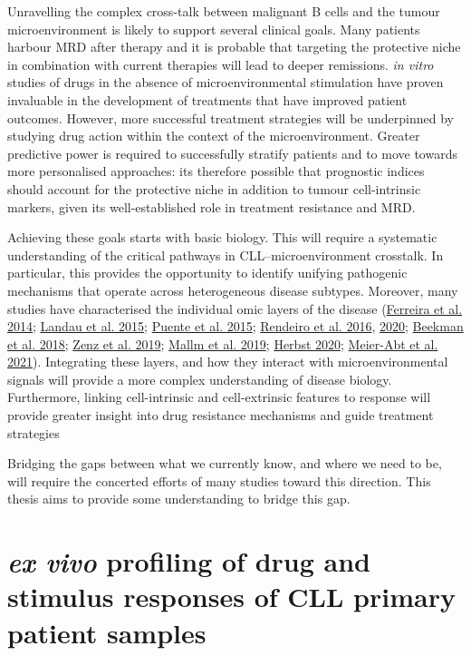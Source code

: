 \documentclass[11pt, a4paper, twosided]{book}
\begin{document}
Unravelling the complex cross-talk between malignant B cells and the tumour microenvironment is likely to support several clinical goals. Many patients harbour MRD after therapy and it is probable that targeting the protective niche in combination with current therapies will lead to deeper remissions. \emph{in vitro} studies of drugs in the absence of microenvironmental stimulation have proven invaluable in the development of treatments that have improved patient outcomes. However, more successful treatment strategies will be underpinned by studying drug action within the context of the microenvironment. Greater predictive power is required to successfully stratify patients and to move towards more personalised approaches: its therefore possible that prognostic indices should account for the protective niche in addition to tumour cell-intrinsic markers, given its well-established role in treatment resistance and MRD.

Achieving these goals starts with basic biology. This will require a systematic understanding of the critical pathways in CLL--microenvironment crosstalk. In particular, this provides the opportunity to identify unifying pathogenic mechanisms that operate across heterogeneous disease subtypes. Moreover, many studies have characterised the individual omic layers of the disease (\protect\hyperlink{ref-Ferreira2014}{Ferreira et al. 2014}; \protect\hyperlink{ref-Landau2015}{Landau et al. 2015}; \protect\hyperlink{ref-Puente2015}{Puente et al. 2015}; \protect\hyperlink{ref-Rendeiro2016}{Rendeiro et al. 2016}, \protect\hyperlink{ref-Rendeiro2020}{2020}; \protect\hyperlink{ref-Beekman2018}{Beekman et al. 2018}; \protect\hyperlink{ref-Zenz2019}{Zenz et al. 2019}; \protect\hyperlink{ref-Mallm2019}{Mallm et al. 2019}; \protect\hyperlink{ref-HerbstThesis}{Herbst 2020}; \protect\hyperlink{ref-MeierAbt2021}{Meier-Abt et al. 2021}). Integrating these layers, and how they interact with microenvironmental signals will provide a more complex understanding of disease biology. Furthermore, linking cell-intrinsic and cell-extrinsic features to response will provide greater insight into drug resistance mechanisms and guide treatment strategies

Bridging the gaps between what we currently know, and where we need to be, will require the concerted efforts of many studies toward this direction. This thesis aims to provide some understanding to bridge this gap.

\hypertarget{ex-vivo-profiling-of-drug-and-stimulus-responses-of-cll-primary-patient-samples}{%
\section{\texorpdfstring{\emph{ex vivo} profiling of drug and stimulus responses of CLL primary patient samples}{ex vivo profiling of drug and stimulus responses of CLL primary patient samples}}\label{ex-vivo-profiling-of-drug-and-stimulus-responses-of-cll-primary-patient-samples}}
\end{document}
